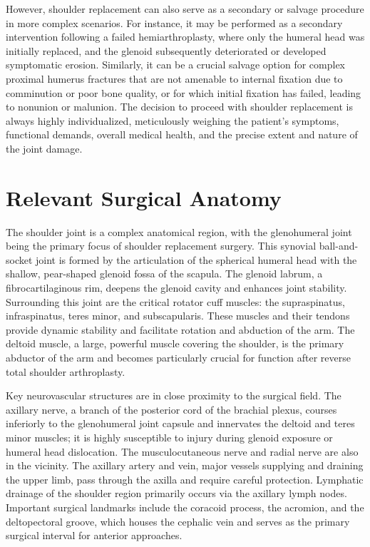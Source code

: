 However, shoulder replacement can also serve as a secondary or salvage procedure in more complex scenarios. For instance, it may be performed as a secondary intervention following a failed hemiarthroplasty, where only the humeral head was initially replaced, and the glenoid subsequently deteriorated or developed symptomatic erosion. Similarly, it can be a crucial salvage option for complex proximal humerus fractures that are not amenable to internal fixation due to comminution or poor bone quality, or for which initial fixation has failed, leading to nonunion or malunion. The decision to proceed with shoulder replacement is always highly individualized, meticulously weighing the patient's symptoms, functional demands, overall medical health, and the precise extent and nature of the joint damage.

\section*{Relevant Surgical Anatomy}
The shoulder joint is a complex anatomical region, with the glenohumeral joint being the primary focus of shoulder replacement surgery. This synovial ball-and-socket joint is formed by the articulation of the spherical humeral head with the shallow, pear-shaped glenoid fossa of the scapula. The glenoid labrum, a fibrocartilaginous rim, deepens the glenoid cavity and enhances joint stability. Surrounding this joint are the critical rotator cuff muscles: the supraspinatus, infraspinatus, teres minor, and subscapularis. These muscles and their tendons provide dynamic stability and facilitate rotation and abduction of the arm. The deltoid muscle, a large, powerful muscle covering the shoulder, is the primary abductor of the arm and becomes particularly crucial for function after reverse total shoulder arthroplasty.

Key neurovascular structures are in close proximity to the surgical field. The axillary nerve, a branch of the posterior cord of the brachial plexus, courses inferiorly to the glenohumeral joint capsule and innervates the deltoid and teres minor muscles; it is highly susceptible to injury during glenoid exposure or humeral head dislocation. The musculocutaneous nerve and radial nerve are also in the vicinity. The axillary artery and vein, major vessels supplying and draining the upper limb, pass through the axilla and require careful protection. Lymphatic drainage of the shoulder region primarily occurs via the axillary lymph nodes. Important surgical landmarks include the coracoid process, the acromion, and the deltopectoral groove, which houses the cephalic vein and serves as the primary surgical interval for anterior approaches.

